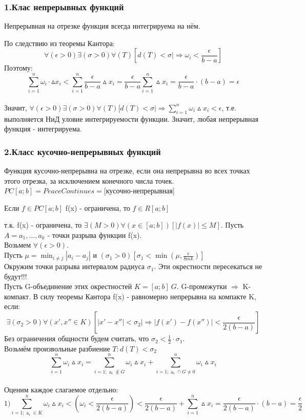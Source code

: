 \subsubsection{1.Клас непрерывных функций}
\begin{teorema}
Непрерывная на отрезке функция всегда интегрируема на нём.
\end{teorema}

\dokvo
По следствию из теоремы Кантора:
$$
\forall(\epsilon>0)\exists(\sigma>0)\forall(T)[d(T)<\sigma|\Rightarrow\omega_i<\frac{\epsilon}{b-a}]
$$
Поэтому:
$$
\sum_{i=1}^{n}\omega_i\cdot\vartriangle x_i < \sum_{i=1}^{n} \frac{\epsilon}{b-a}\vartriangle x_i = \frac{\epsilon}{b-a}\sum_{i=1}^{n}\vartriangle x_i = \frac{\epsilon}{b-a}\cdot (b-a)=\epsilon
$$
\\
Значит, $\forall(\epsilon>0)\exists(\sigma>0)\forall(T)[d(T)<\sigma|\Rightarrow\sum_{i=1}^{n}\omega_i\vartriangle x_i < \epsilon$, т.е. выполняется НиД уловие интегрируемости функции. Значит, любая непрерывная функция - интегрируема.
\dokno

\subsubsection{2.Класс кусочно-непрерывных функций}
\begin{opred}
Функция кусочно-непрерывна на отрезке, если она непрерывна во всех точках этого отрезка, за исключением конечного числа точек.
$PC[a;b]=Peace Continues=$[кусочно-непрерывная]
\end{opred}

\begin{teorema}
Если $f\in PC[a;b]$ f(x) - ограничена, то $f \in R[a;b]$
\end{teorema}

\dokvo
т.к. f(x) - ограничена, то $\exists(M>0)\forall(x\in[a;b])[|f(x)|\leq M]$. Пусть $A=a_1,...,a_k$ - точки разрыва функции f(x).
\\
Возьмем $\forall(\epsilon>0).$
\\
Пусть $\mu=\min_{i\neq j}|a_i-a_j|$ и $(\sigma_1>0)[\sigma_1<\min(\mu,\frac{\epsilon}{8mk})]$
\\
Окружим точки разрыва интервалом радиуса $\sigma_1$. Эти окрестности пересекаться не будут!!!
\\
Пусть G-объединение этих окрестностей $K=[a;b]\ G.$ G-промежутки $\Rightarrow$ K-компакт. В силу теоремы Кантора f(x) - равномерно непрерывна на компакте K, если:
$$
\exists(\sigma_2>0)\forall(x',x''\in K)[|x'-x''|<\sigma_2|\Rightarrow|f(x')-f(x'')|<\frac{\epsilon}{2(b-a)}]
$$
Без ограничения общности будем считать, что $\sigma_2<\frac{1}{2}\cdot \sigma_1.$
\\
Возьмём произвольные разбиение $T:d(T)<\sigma_2$
$$
\sum_{i=1}^{n}\omega_i\vartriangle x_i = \sum_{i=1;\vartriangle_i\notin G}^{n}\omega_i\vartriangle x_i + \sum_{i=1;\vartriangle_i \cap G \neq 0}^{n}
\omega_i\vartriangle x_i$$
\\
Оценим каждое слагаемое отдельно:
$$
1) \sum_{i=1;\vartriangle_i\in K}^{n}\omega_i\vartriangle x_i<(\omega_i<\frac{\epsilon}{2(b-a)})<\frac{\epsilon}{2(b-a)}+\sum_{i=1}^{n}\vartriangle x_i = \frac{\epsilon}{2(b-a)}\cdot (b-a)=\frac{\epsilon}{2}
$$

